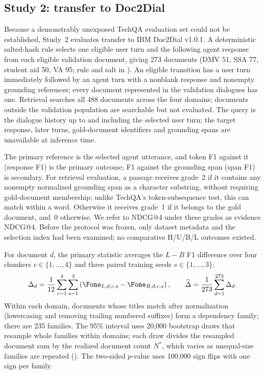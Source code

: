 \subsection{Study 2: transfer to Doc2Dial}
Because a demonstrably unexposed TechQA evaluation set could not be established, Study~2 evaluates transfer to IBM Doc2Dial v1.0.1. A deterministic salted-hash rule selects one eligible user turn and the following agent response from each eligible validation document, giving 273 documents (DMV 51, SSA 77, student aid 50, VA 95; rule and salt in ). An eligible transition has a user turn immediately followed by an agent turn with a nonblank response and nonempty grounding references; every document represented in the validation dialogues has one. Retrieval searches all 488 documents across the four domains; documents outside the validation population are searchable but not evaluated. The query is the dialogue history up to and including the selected user turn; the target response, later turns, gold-document identifiers and grounding spans are unavailable at inference time.

The primary reference is the selected agent utterance, and token F1 against it (response F1) is the primary outcome; F1 against the grounding span (span F1) is secondary. For retrieval evaluation, a passage receives grade~2 if it contains any nonempty normalized grounding span as a character substring, without requiring gold-document membership; unlike TechQA's token-subsequence test, this can match within a word. Otherwise it receives grade~1 if it belongs to the gold document, and~0 otherwise. We refer to NDCG@4 under these grades as evidence NDCG@4. Before the protocol was frozen, only dataset metadata and the selection index had been examined; no comparative H/U/B/L outcomes existed.

For document $d$, the primary statistic averages the $L-B$ F1 difference over four chunkers $c\in\{1,\ldots,4\}$ and three paired training seeds $s\in\{1,\ldots,3\}$:
\begin{equation}
 \Delta_d=\frac{1}{12}\sum_{c=1}^4\sum_{s=1}^3\left(\Fone_{L,d,c,s}-\Fone_{B,d,c,s}\right),\qquad
 \widehat\Delta=\frac{1}{273}\sum_{d=1}^{273}\Delta_d.
\end{equation}
Within each domain, documents whose titles match after normalization (lowercasing and removing trailing numbered suffixes) form a dependency family; there are 235 families. The 95\% interval uses 20,000 bootstrap draws that resample whole families within domains; each draw divides the resampled document sum by the realized document count $N^*$, which varies as unequal-size families are repeated (). The two-sided $p$-value uses 100,000 sign flips with one sign per family.

